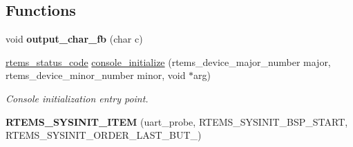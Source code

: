 \subsection*{Functions}
\begin{DoxyCompactItemize}
\item 
\mbox{\label{arm_2raspberrypi_2console_2console-config_8c_aea3c0dc4a1a1f9f743640499251de0b4}} 
void {\bfseries output\+\_\+char\+\_\+fb} (char c)
\item 
\mbox{\hyperlink{group__ClassicStatus_ga545d41846817eaba6143d52ee4d9e9fe}{rtems\+\_\+status\+\_\+code}} \mbox{\hyperlink{arm_2raspberrypi_2console_2console-config_8c_a4bdc321ef3ab62a261d77b5dbe075566}{console\+\_\+initialize}} (rtems\+\_\+device\+\_\+major\+\_\+number major, rtems\+\_\+device\+\_\+minor\+\_\+number minor, void $\ast$arg)
\begin{DoxyCompactList}\small\item\em Console initialization entry point. \end{DoxyCompactList}\item 
\mbox{\label{arm_2raspberrypi_2console_2console-config_8c_a0c862cc30a7afde6932d6f3994a9abdb}} 
{\bfseries R\+T\+E\+M\+S\+\_\+\+S\+Y\+S\+I\+N\+I\+T\+\_\+\+I\+T\+EM} (uart\+\_\+probe, R\+T\+E\+M\+S\+\_\+\+S\+Y\+S\+I\+N\+I\+T\+\_\+\+B\+S\+P\+\_\+\+S\+T\+A\+RT, R\+T\+E\+M\+S\+\_\+\+S\+Y\+S\+I\+N\+I\+T\+\_\+\+O\+R\+D\+E\+R\+\_\+\+L\+A\+S\+T\+\_\+\+B\+U\+T\+\_)
\end{DoxyCompactItemize}
